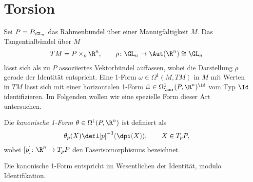\documentclass[%
	paper=a5,%
	fleqn,%
	DIV=18,%
	BCOR=0mm,
	fontsize=11pt,
	titlepage=false,%
	bibliography=totoc,
	DIV=18,%
	twoside=true,
	pdftitle=Riemannsche Geometrie,
	pdfauthor=Uwe Semmelmann,
	numbers=noendperiod]%
	{scrbook}
\begin{document}
\section{Torsion}

Sei $P=P_{\GL_n}$ das Rahmenbündel über einer Mannigfaltigkeit $M$. Das
Tangentialbündel über $M$
\begin{align*}
TM = P\times_\rho \R^n,\qquad \rho\colon \GL_n\to \Aut(\R^n) \cong \GL_n
\end{align*}
lässt sich als zu $P$ assoziiertes Vektorbündel auffassen, wobei die Darstellung
$\rho$ gerade der Identität entspricht. Eine 1-Form $\omega\in \Omega^1(M,TM)$
in $M$ mit Werten in $TM$ lässt sich mit einer horizontalen 1-Form
$\bar{\omega}\in \Omega_\hor^1(P,\R^n)^\id$ vom Typ $\Id$ identifizieren. Im
Folgenden wollen wir eine spezielle Form dieser Art untersuchen.

\begin{defn}
Die \emph{kanonische 1-Form $\theta\in\Omega^1(P,\R^n)$} ist definiert als
\begin{align*}
\theta_p(X) \defl [p]^{-1}(\dpi(X)),\qquad X\in T_pP,
\end{align*}
wobei $[p]\colon \R^n\to T_pP$ den Faserisomorphismus bezeichnet.\fish
\end{defn}

Die kanonische 1-Form entspricht im Wesentlichen der Identit\"at, modulo Identifikation.
\end{document}
